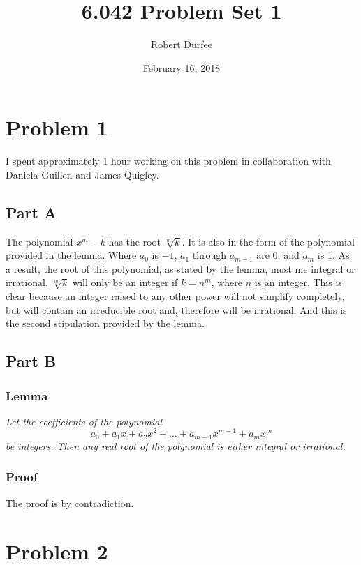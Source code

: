 \documentclass{article}
\title{ 6.042 Problem Set 1 }
\author{ Robert Durfee }
\date{ February 16, 2018 }
\begin{document}
\maketitle

\section*{Problem 1 }

I spent approximately 1 hour working on this problem in collaboration with
Daniela Guillen and James Quigley.

\subsection*{Part A}

The polynomial $ x^{m} - k $ has the root $\sqrt[m]{k}$. It is also in the form
of the polynomial provided in the lemma.  Where $a_{0}$ is $-1$, $a_{1}$ through
$a_{m-1}$ are 0, and $a_{m}$ is 1. As a result, the root of this polynomial, as
stated by the lemma, must me integral or irrational. $\sqrt[m]{k}$ will only be
an integer if $k = n^{m}$, where $n$ is an integer. This is clear because an
integer raised to any other power will not simplify completely, but will contain
an irreducible root and, therefore will be irrational.  And this is the second
stipulation provided by the lemma.

\subsection*{Part B}

\subsubsection*{Lemma}

\textit{Let the coefficients of the polynomial}
$$ a_{0} + a_{1}x + a_{2}x^{2} + \ldots + a_{m-1}x^{m-1} + a_{m}x^{m} $$
\textit{be integers. Then any real root of the polynomial is either integral or
irrational.}

\subsubsection*{Proof}

The proof is by contradiction.

\section*{Problem 2}
\end{document}
